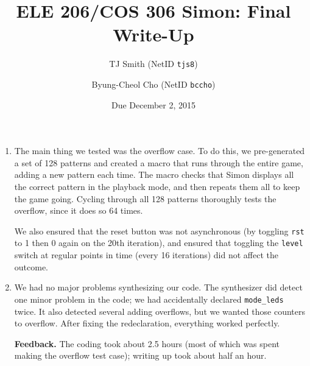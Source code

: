\documentclass[12pt]{article}
\title{ELE 206/COS 306 Simon: Final Write-Up}
\author{TJ Smith (NetID \texttt{tjs8})\and Byung-Cheol Cho (NetID \texttt{bccho})}
\date{Due December 2, 2015}
\begin{document}
\maketitle

\begin{enumerate}[label=\textbf{Question \arabic*.}]
%
\item The main thing we tested was the overflow case. To do this, we pre-generated a set of 128 patterns and created a macro that runs through the entire game, adding a new pattern each time. The macro checks that Simon displays all the correct pattern in the playback mode, and then repeats them all to keep the game going. Cycling through all 128 patterns thoroughly tests the overflow, since it does so 64 times.

We also ensured that the reset button was not asynchronous (by toggling \texttt{rst} to 1 then 0 again on the 20th iteration), and ensured that toggling the \texttt{level} switch at regular points in time (every 16 iterations) did not affect the outcome. %

%
\item We had no major problems synthesizing our code. The synthesizer did detect one minor problem in the code; we had accidentally declared \texttt{mode_leds} twice. It also detected several adding overflows, but we wanted those counters to overflow. After fixing the redeclaration, everything worked perfectly.
%
\item[\textbf{Feedback.}] The coding took about 2.5 hours (most of which was spent making the overflow test case); writing up took about half an hour.
%
\end{enumerate}
\end{document}
